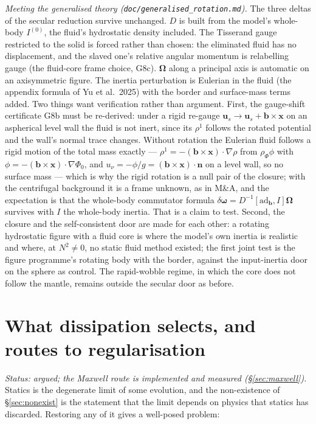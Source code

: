 \documentclass[11pt]{article}
\newcommand{\bu}{\mathbf{u}}
\newcommand{\bn}{\mathbf{n}}
\newcommand{\code}[1]{\texttt{#1}}
\begin{document}
\emph{Meeting the generalised theory
(\code{doc/generalised\_rotation.md}).} The three deltas of the secular
reduction survive unchanged. $D$ is built from the model's whole-body
$I^{(0)}$, the fluid's hydrostatic density included. The Tisserand
gauge restricted to the solid is forced rather than chosen: the
eliminated fluid has no displacement, and the slaved one's relative
angular momentum is relabelling gauge (the fluid-core frame choice,
G8c). $\boldsymbol\Omega$ along a principal axis is automatic on an
axisymmetric figure. The inertia perturbation is Eulerian in the fluid
(the appendix formula of Yu et al.\ 2025) with the border and
surface-mass terms added. Two things want verification rather than
argument. First, the gauge-shift certificate G8b must be re-derived:
under a rigid re-gauge $\bu_s \to \bu_s + \mathbf b\times\mathbf x$ on an
aspherical level wall the fluid is not inert, since its $\rho^1$ follows
the rotated potential and the wall's normal trace changes. Without
rotation the Eulerian fluid follows a rigid motion of the total mass
exactly --- $\rho^1 = -(\mathbf b\times\mathbf x)\cdot\nabla\rho$ from
$\rho_\Phi\phi$ with $\phi = -(\mathbf b\times\mathbf x)\cdot\nabla\Phi_0$,
and $u_\nu = -\phi/g = (\mathbf b\times\mathbf x)\cdot\bn$ on a level
wall, so no surface mass --- which is why the rigid rotation is a null
pair of the closure; with the centrifugal background it is a frame
unknown, as in M\&A, and the expectation is that the whole-body
commutator formula $\delta\boldsymbol\omega = D^{-1}[\mathrm{ad}_{\mathbf b}, I]\boldsymbol\Omega$
survives with $I$ the whole-body inertia. That is a claim to test.
Second, the closure and the self-consistent door are made for each
other: a rotating hydrostatic figure with a fluid core is where the
model's own inertia is realistic and where, at $N^2 \neq 0$, no static
fluid method existed; the first joint test is the figure programme's
rotating body with the border, against the input-inertia door on the
sphere as control. The rapid-wobble regime, in which the core does not
follow the mantle, remains outside the secular door as before.

\section{What dissipation selects, and routes to regularisation}
\label{sec:regular}

\emph{Status: argued; the Maxwell route is implemented and measured
(\S\ref{sec:maxwell}).}
Statics is the degenerate limit of some evolution, and the
non-existence of \S\ref{sec:nonexist} is the statement that the
limit depends on physics that statics has discarded. Restoring any of
it gives a well-posed problem:
\end{document}
